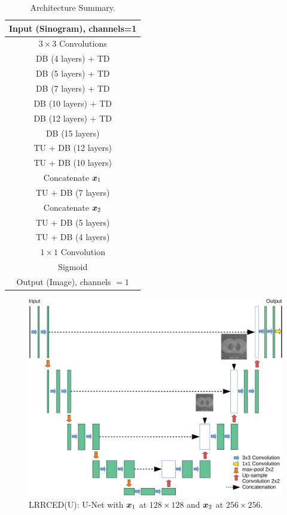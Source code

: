 \begin{table}[ht!]
	\centering
	\caption{Architecture Summary.}
	\label{table:1a}
	\begin{tabular}{||c||} 
		\hline
		Input (Sinogram), channels=1 \\ 
		\hline
		$3 \times 3$ Convolutions \\ 
		\hline
		DB (4 layers) + TD  \\ 
		\hline
		DB (5 layers) + TD    \\ 
		\hline
		DB (7 layers) + TD \\  
		\hline 
		DB (10 layers) + TD \\ 
		\hline
		DB (12 layers) + TD \\  
		\hline
		DB (15 layers)    \\  
		\hline
		TU + DB (12 layers) \\
		\hline
		TU + DB (10 layers) \\
		Concatenate $\bm{x}_1$  \\
		\hline
		TU + DB (7 layers) \\
		Concatenate $\bm{x}_2$  \\     
		\hline
		TU + DB (5 layers) \\
		\hline
		TU + DB (4 layers) \\
		\hline
		$1\times 1$ Convolution \\
		\hline
		Sigmoid     \\
		\hline  
		Output (Image), channels $=1$ \\
		\hline  
		
		
	\end{tabular}
	
\end{table}


\begin{figure}[!htbp]
	\centering
	\includegraphics[width=0.8\linewidth]{./Figures/u_net-crop.pdf}
	\caption{\ac{LRRCED}(U): U-Net with $\bm{x}_1$ at $128\times128$ and $\bm{x}_2$ at $256\times256$.}
	\label{fig:un}
\end{figure}

